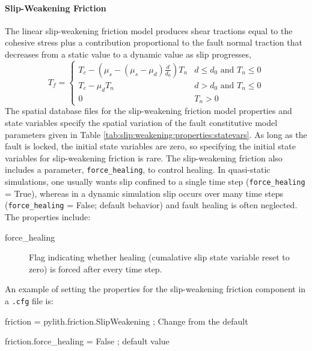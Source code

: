 \paragraph{Slip-Weakening Friction}
\label{sec:friction:slip:weakening}

The linear slip-weakening friction model produces shear tractions
equal to the cohesive stress plus a contribution proportional to the
fault normal traction that decreases from a static value to a dynamic
value as slip progresses,
\begin{equation}
T_{f}=\begin{cases}
T_{c}-(\mu_{s}-(\mu_{s}-\mu_{d})\frac{d}{d_{0}})T_{n} & d\leq d_{0}\text{ and }T_{n}\leq0\\
T_{c}-\mu_{d}T_{n} & d>d_{0}\text{ and }T_{n}\leq0\\
0 & T_{n}>0
\end{cases}
\end{equation}
The spatial database files for the slip-weakening friction model properties
and state variables specify the spatial variation of the fault constitutive
model parameters given in Table \vref{tab:slip:weakening:properties:statevars}.
As long as the fault is locked, the initial state variables are zero,
so specifying the initial state variables for slip-weakening friction
is rare. The slip-weakening friction also includes a parameter, \texttt{force\_healing},
to control healing. In quasi-static simulations, one usually wants
slip confined to a single time step (\texttt{force\_healing} = True),
whereas in a dynamic simulation slip occurs over many time steps (\texttt{force\_healing}
= False; default behavior) and fault healing is often neglected. The
properties include:
\begin{description}
\item [{force\_healing}] Flag indicating whether healing (cumalative slip
state variable reset to zero) is forced after every time step.
\end{description}
An example of setting the properties for the slip-weakening friction
component in a \texttt{.cfg} file is:
\begin{lyxcode}

friction = pylith.friction.SlipWeakening ; Change from the default

friction.force\_healing = False ; default value
\end{lyxcode}

